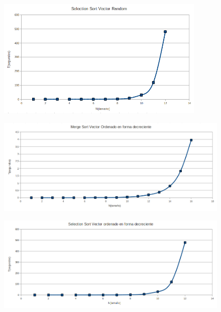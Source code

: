 \begin{figure}[!htp]
\begin{center}
\includegraphics[width=10cm]{Imagenes/SelectionSortVectorRandom.PNG}
\end{center}
\end{figure} 

\newpage

\begin{figure}[!htp]
\begin{center}
\includegraphics[width=12cm]{Imagenes/MergeSortOrdenadodecreciente.PNG}
\end{center}
\end{figure} 

\begin{figure}[!htp]
\begin{center}
\includegraphics[width=12cm]{Imagenes/SelectionSortOrdenadodecreciente.PNG}
\end{center}
\end{figure} 

